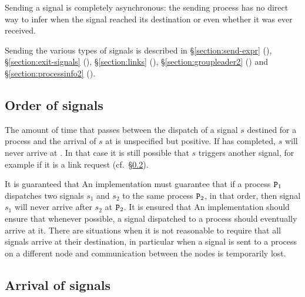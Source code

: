 Sending a signal is completely asynchronous: the sending process has no direct way
to infer when the signal reached its destination or even whether it was ever received.

Sending the various types of signals is described in \S\ref{section:send-expr} (),
\S\ref{section:exit-signals} (), \S\ref{section:links} (), \S\ref{section:groupleader2} () and
\S\ref{section:processinfo2} ().

\subsection{Order of signals}

\label{section:signal-order}

The amount of time that passes between the dispatch of a signal $s$ destined
for a process 
and the arrival of $s$ at  is unspecified but positive. If 
has completed, $s$ will never arrive at .  In that case it is still possible that
$s$ triggers another signal, for example if it is a link request
(cf.~\S\ref{section:signal-arrival}).

\ifOld It is guaranteed that \fi
\ifNew An implementation must guarantee that \fi
if a process ${\tt{\sl P}}_1$ dispatches two signals $s_1$ and $s_2$
to the same process ${\tt{\sl P}}_2$, in that order, then signal $s_1$ will never
arrive after $s_2$ at ${\tt{\sl P}}_2$.
\ifOld It is ensured that \fi
\ifNew An implementation should ensure that \fi
whenever possible, a signal dispatched to a process should eventually arrive at it.
There are
situations when it is not reasonable to require that all signals arrive at their
destination, in particular when a signal is sent to a process on a different node
and communication between the nodes is temporarily lost.

\subsection{Arrival of signals}

\label{section:signal-arrival}

